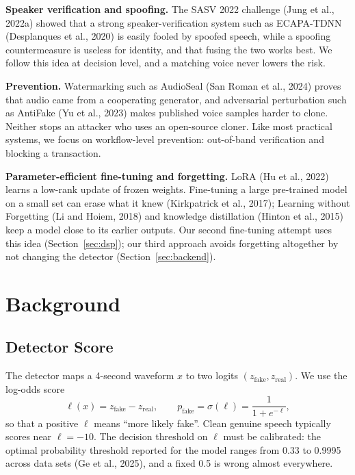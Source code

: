 \documentclass[10pt,a4paper,twocolumn]{article}
\newcommand{\llr}{\ell}
\begin{document}
\textbf{Speaker verification and spoofing.} The SASV 2022 challenge (Jung et al., 2022a) showed that a strong speaker-verification system such as ECAPA-TDNN (Desplanques et al., 2020) is easily fooled by spoofed speech, while a spoofing countermeasure is useless for identity, and that fusing the two works best. We follow this idea at decision level, and a matching voice never lowers the risk.

\textbf{Prevention.} Watermarking such as AudioSeal (San Roman et al., 2024) proves that audio came from a cooperating generator, and adversarial perturbation such as AntiFake (Yu et al., 2023) makes published voice samples harder to clone. Neither stops an attacker who uses an open-source cloner. Like most practical systems, we focus on workflow-level prevention: out-of-band verification and blocking a transaction.

\textbf{Parameter-efficient fine-tuning and forgetting.} LoRA (Hu et al., 2022) learns a low-rank update of frozen weights. Fine-tuning a large pre-trained model on a small set can erase what it knew (Kirkpatrick et al., 2017); Learning without Forgetting (Li and Hoiem, 2018) and knowledge distillation (Hinton et al., 2015) keep a model close to its earlier outputs. Our second fine-tuning attempt uses this idea (Section~\ref{sec:dsp}); our third approach avoids forgetting altogether by not changing the detector (Section~\ref{sec:backend}).

\section{Background}
\subsection{Detector Score}
The detector maps a 4-second waveform $x$ to two logits $(z_{\text{fake}}, z_{\text{real}})$. We use the log-odds score
\begin{equation}
\llr(x)=z_{\text{fake}}-z_{\text{real}},\qquad p_{\text{fake}}=\sigma(\llr)=\frac{1}{1+e^{-\llr}} ,
\label{eq:llr}
\end{equation}
so that a positive $\llr$ means ``more likely fake''. Clean genuine speech typically scores near $\llr=-10$. The decision threshold on $\llr$ must be calibrated: the optimal probability threshold reported for the model ranges from 0.33 to 0.9995 across data sets (Ge et al., 2025), and a fixed 0.5 is wrong almost everywhere.
\end{document}
